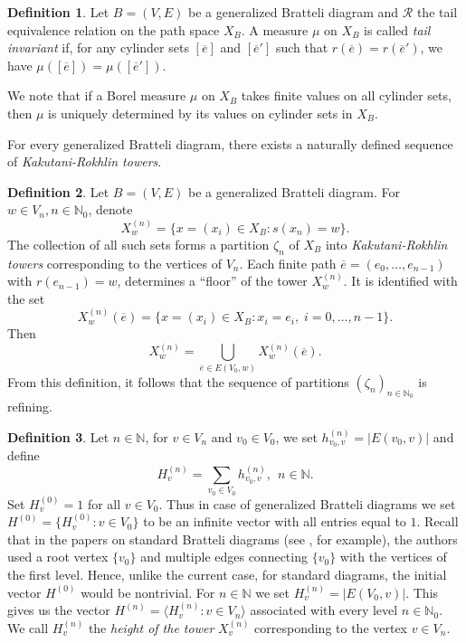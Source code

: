 \documentclass[11pt,reqno]{amsart}
\theoremstyle{definition}
\newtheorem{definition}{Definition}[section]
\theoremstyle{remark}
\theoremstyle{plain}
\def\ol{\overline}
\def\ov{\overline}
\newcommand{\N}{\mathbb N}
\numberwithin{equation}{section}
\begin{document}
\begin{definition}\label{def: tail inv meas} Let 
$B =(V, E)$ be 
a generalized Bratteli diagram and $\mathcal R$ the tail equivalence relation on the path space $X_B$. A measure $\mu$ on 
$X_B$ is called \textit{tail invariant} if, for any cylinder sets
$[\ol e]$ and $[\ol e']$ such that $r(\ol e) = r(\ol e')$, we have
$\mu([\ol e]) = \mu([\ol e'])$.
\end{definition}

We note that if a Borel measure $\mu$ on $X_B$ takes finite values on all cylinder sets, then $\mu$ is uniquely 
determined by its values on cylinder sets in $X_B$. 

For every generalized Bratteli diagram, there exists a naturally defined 
sequence of \textit{Kakutani-Rokhlin towers}.

\begin{definition} \label{Def:Kakutani-Rokhlin} Let 
$B =(V, E)$ 
be a generalized Bratteli diagram. For $w \in V_n, 
n \in \N_0$, denote 
$$
X_w^{(n)} = \{x = (x_i)\in X_B : s(x_{n}) = w\}.
$$
The collection of all such sets forms a partition
$\zeta_n$ of $X_B$ into  
\textit{Kakutani-Rokhlin towers}
corresponding to the vertices of $V_{n}$. 
Each finite path $\ov e = (e_0, \ldots, e_{n-1})$ with
$r(e_{n-1}) 
= w$, determines a ``floor'' of the tower $X_w^{(n)}$. It is identified with the set 
$$
X_w^{(n)}(\ov e) = \{x = (x_i)\in X_B : x_i = e_i,\; i = 
0,\ldots, n-1 \}.
$$
Then 
$$
X_w^{(n)} = \bigcup_{\ol e \in E(V_0, w)} X_w^{(n)}(\ov e).
$$ 
From this definition, it follows that the sequence of partitions $(\zeta_n)_{n \in \N_0}$ is refining. 
\end{definition}

\begin{definition}\label{Def:Height} Let $n \in \N$, for $v \in V_n$ and $v_0 \in
V_0$, we set $h^{(n)}_{v_0, v} = |E(v_0, v)| $ and define 
$$
H^{(n)}_v = \sum_{v_0 \in V_0} h^{(n)}_{v_0, v}, \ \ n \in \N.
$$ 
Set $H^{(0)}_v = 1$ for all $v\in V_0$. Thus in case of generalized Bratteli diagrams we set $H^{(0)} =\{ H_{v}^{(0)}: v \in V_0\}$ to be an infinite vector with all entries equal to $1$. Recall that in the papers on standard Bratteli diagrams (see \cite{BezuglyiKarpelKwiatkowski2015, AdamskaBezuglyiKarpelKwiatkowski2017}, for example), the authors used a root vertex $\{v_0\}$ and multiple edges connecting $\{v_0\}$ with the vertices of the first level. Hence, unlike the current case, for standard diagrams, the initial vector $H^{(0)}$ would be nontrivial. For $n \in \N$ we set $H^{(n)}_v = |E(V_0, v)|$. 
This gives us the vector $H^{(n)} = \langle H^{(n)}_{v} : 
v \in V_n \rangle$ associated with every level $n\in \N_0$. 
We call $H^{(n)}_v$ the \textit{height of the tower} $X_v^{(n)}$ 
corresponding to the vertex $v\in V_n$.
\end{definition}
\end{document}
